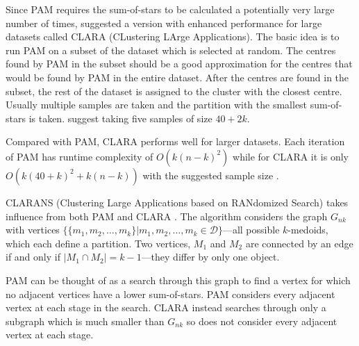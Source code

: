 \documentclass[a4paper]{report}
\newcommand{\dset}{\mathcal{D}}
\begin{document}
Since PAM requires the sum-of-stars to be calculated a potentially very large
number of times, \citet{kaufman2005finding} suggested a version with enhanced
performance for large datasets called CLARA (CLustering LArge Applications).
The basic idea is to run PAM on a subset of the dataset which is selected at
random.  The centres found by PAM in the subset should be a good approximation
for the centres that would be found by PAM in the entire dataset.  After the
centres are found in the subset, the rest of the dataset is assigned to the
cluster with the closest centre.  Usually multiple samples are taken and the
partition with the smallest sum-of-stars is taken.  \citet{kaufman2005finding}
suggest taking five samples of size $40+2k$.

Compared with PAM, CLARA performs well for larger datasets.  Each iteration of
PAM has runtime complexity of $O(k(n-k)^2)$ while for CLARA it is only
$O(k(40+k)^2 + k(n-k))$ with the suggested sample size \citep{ng2002clarans}.

CLARANS (Clustering Large Applications based on RANdomized Search) takes
influence from both PAM and CLARA \citep{ng2002clarans}.  The algorithm
considers the graph $G_{nk}$ with vertices $\{\{m_1,m_2,\dotsc,m_k\} |
m_1,m_2,\dotsc,m_k \in \dset\}$---all possible $k$-medoids, which each define
a partition.  Two vertices, $M_1$ and $M_2$ are connected by an edge if and
only if $|M_1 \cap M_2| = k-1$---they differ by only one object.

PAM can be thought of as a search through this graph to find a vertex for
which no adjacent vertices have a lower sum-of-stars.  PAM considers every
adjacent vertex at each stage in the search.  CLARA instead searches through
only a subgraph which is much smaller than $G_{nk}$ so does not consider every
adjacent vertex at each stage.
\end{document}
